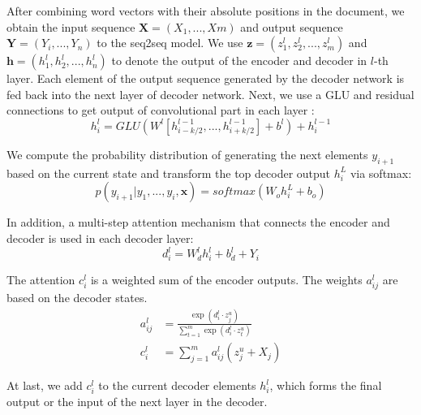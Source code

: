 After combining word vectors with their absolute positions in the document,
we obtain the input sequence
$\textbf{X}=(X_{1},...,{Xm})$ and output sequence $\textbf{Y}=(Y_{i},...,Y_{n})$
to the seq2seq model.
We use $\textbf{z}=(z^l_{1}, z^l_{2},..., z^l_{m})$ and
$\textbf{h}=(h^l_{1}, h^l_{2},..., h^l_{n})$
to denote the output of the encoder and decoder in $l$-th layer.
Each element of the output sequence generated by the decoder network
is fed back into the next layer of decoder network.
Next, we use a GLU \cite{DauphinFAG17} and residual connections to get
output of convolutional part in each layer \cite{HeZRS16}:
\begin{equation}
h^l_{i} \!=\! GLU(W^l[h^{l-1}_{i-k/2},...,h^{l-1}_{i+k/2}]\!+\!b^l)\!+\!h^{l-1}_{i}
\end{equation}

We compute the probability distribution of generating the
next elements $y_{i+1}$ based
on the current state and transform the top decoder output $h^L_{i}$ via softmax:
\begin{equation}
p(y_{i+1}|y_{1},...,y_{i},\textbf{x})\!=\!softmax(W_{o}h^L_{i}\!+\!b_{o})
\end{equation}

In addition, a multi-step attention mechanism that connects the encoder and
decoder is used in each decoder layer:
\begin{equation}
d^l_{i}\!=\!W^l_{d}h^l_{i}\!+\!b^l_{d}+Y_{i}
\end{equation}

The attention $c^l_{i}$ is a weighted sum of the encoder outputs.
The weights $a^l_{ij}$ are based on the decoder states.
\begin{align}
a^l_{ij} \!&=\! \frac {\exp(d^l_{i}\cdot z^u_{j})}{\sum^m_{t=1} \exp(d^l_{i}\cdot z^u_{t})} \\
c^l_{i}  \!&=\! \sum^m_{j=1} a^l_{ij}(z^u_{j}+X_{j})
\end{align}

At last, we add $c^l_{i}$ to the current decoder elements $h^l_{i}$,
which forms the final output or the
input of the next layer in the decoder.



